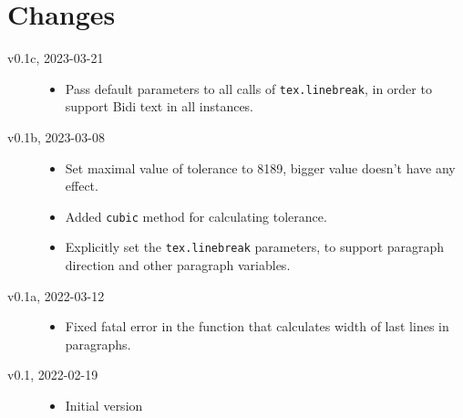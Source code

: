 \documentclass{l3doc}
\begin{document}
\section{Changes}

\begin{description}
  \item[v0.1c, 2023-03-21]\hfill
    \begin{itemize}
      \item Pass default parameters to all calls of \verb|tex.linebreak|, in order to support Bidi text in all instances.
    \end{itemize}
  \item[v0.1b, 2023-03-08]\hfill
    \begin{itemize}
      \item Set maximal value of tolerance to 8189, bigger value doesn't have any effect.
      \item Added \verb|cubic| method for calculating tolerance.
      \item Explicitly set the \verb|tex.linebreak| parameters, to support paragraph direction and other paragraph variables.
    \end{itemize}
  \item[v0.1a, 2022-03-12]\hfill

    \begin{itemize}
      \item Fixed fatal error in the function that calculates width of last lines in paragraphs.
    \end{itemize}

  \item[v0.1, 2022-02-19]\hfill

    \begin{itemize}
      \item Initial version
    \end{itemize}
\end{description}
\end{document}
